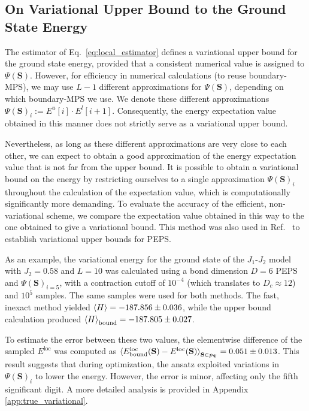 \documentclass[aps,notitlepage,twocolumn,nofootinbib,superscriptaddress,pra,10pt]{revtex4-2}
\begin{document}
\subsection{On Variational Upper Bound to the Ground State Energy}
The estimator of Eq.~\eqref{eq:local_estimator} defines a variational upper bound for the ground state energy, provided that a consistent numerical value is assigned to $\Psi(\textbf{S})$.
However, for efficiency in numerical calculations (to reuse boundary-MPS), we may use $L-1$ different approximations for $\Psi(\textbf{S})$, depending on which boundary-MPS we use. 
We denote these different approximations $\Psi(\mathbf{S})_i := E^u[i] \cdot E^l[i+1]$. 
Consequently, the energy expectation value obtained in this manner does not strictly serve as a variational upper bound.

Nevertheless, as long as these different approximations are very close to each other, we can expect to obtain a good approximation of the energy expectation value that is not far from the upper bound.
It is possible to obtain a variational bound on the energy by restricting ourselves to a single approximation $\Psi(\mathbf{S})_i$ throughout the calculation of the expectation value, which is computationally significantly more demanding.
To evaluate the accuracy of the efficient, non-variational scheme, we compare the expectation value obtained in this way to the one obtained to give a variational bound. 
This method was also used in Ref.~\cite{liu2024tensor} to establish variational upper bounds for PEPS.

As an example, the variational energy for the ground state of the $J_1$-$J_2$ model with $J_2 = 0.58$ and $L = 10$ was calculated using a bond dimension $D=6$ PEPS and $\Psi(\mathbf{S})_{i=5}$, with a contraction cutoff of $10^{-4}$ (which translates to $D_c\approx 12$) and $10^5$ samples. The same samples were used for both methods. The fast, inexact method yielded $\braket{H} = -187.856 \pm 0.036$, while the upper bound calculation produced $\braket{H}_\text{bound} = -187.805 \pm 0.027$. 

To estimate the error between these two values, the elementwise difference of the sampled $E^\text{loc}$ was computed as $\braket{E^\text{loc}_\text{bound}(\mathbf{S}) - E^\text{loc}(\mathbf{S})}_{\mathbf{S} \in p_\Psi} = 0.051 \pm 0.013$. This result suggests that during optimization, the ansatz exploited variations in $\Psi(\mathbf{S})_i$ to lower the energy. However, the error is minor, affecting only the fifth significant digit. A more detailed analysis is provided in Appendix \ref{app:true_variational}.
\end{document}
